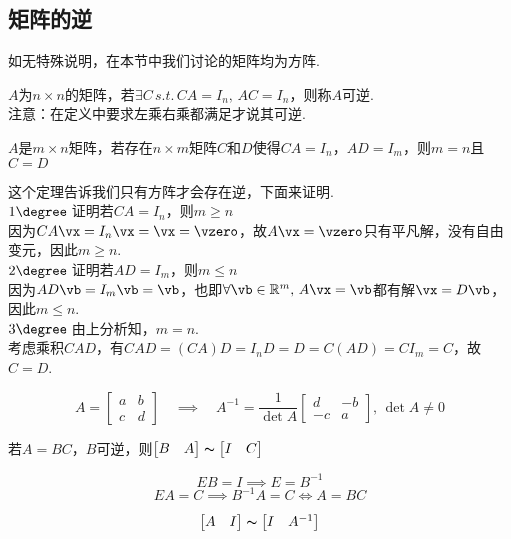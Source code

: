 \subsection{矩阵的逆}
如无特殊说明，在本节中我们讨论的矩阵均为方阵.
\begin{definition}[逆]
$A$为$n\times n$的矩阵，若$\exists C\,s.t.\,CA=I_n,\,AC=I_n$，则称$A$可逆.\\
注意：在定义中要求左乘右乘都满足才说其可逆.
\end{definition}
\begin{theorem}
$A$是$m\times n$矩阵，若存在$n\times m$矩阵$C$和$D$使得$CA=I_n$，$AD=I_m$，则$m=n$且$C=D$
\end{theorem}
\begin{analysis}
这个定理告诉我们只有方阵才会存在逆，下面来证明.\\
$1\degree\;$证明若$CA=I_n$，则$m\geq n$\\
因为$CA\vx=I_n\vx=\vx=\vzero$，故$A\vx=\vzero$只有平凡解，没有自由变元，因此$m\geq n$.\\
$2\degree\;$证明若$AD=I_m$，则$m\leq n$\\
因为$AD\vb=I_m\vb=\vb$，也即$\forall \vb\in\mathbb{R}^m,\,A\vx=\vb$都有解$\vx=D\vb$，因此$m\leq n$.\\
$3\degree\;$由上分析知，$m=n$.\\
考虑乘积$CAD$，有$CAD=(CA)D=I_nD=D=C(AD)=CI_m=C$，故$C=D$.
\end{analysis}
\begin{theorem}[二阶矩阵的逆]
\[A=\begin{bmatrix}
a&b\\c&d
\end{bmatrix}\quad\implies\quad
A^{-1}=\dfrac{1}{\det A}\begin{bmatrix}
d&-b\\-c&a
\end{bmatrix},\,\det A\ne 0\]
\end{theorem}
\begin{proposition}
\label{row_redu_alg}
若$A=BC$，$B$可逆，则$\begin{bmatrix}B&A\end{bmatrix}\thicksim\begin{bmatrix}I&C\end{bmatrix}$
\end{proposition}
\begin{analysis}
\[EB=I\implies E=B^{-1}\]
\[EA=C\implies B^{-1}A=C\iff A=BC\]
\end{analysis}
\begin{myalgorithm}[求逆]
\[\begin{bmatrix}A&I\end{bmatrix}\thicksim\begin{bmatrix}I&A^{-1}\end{bmatrix}\]
\end{myalgorithm}

